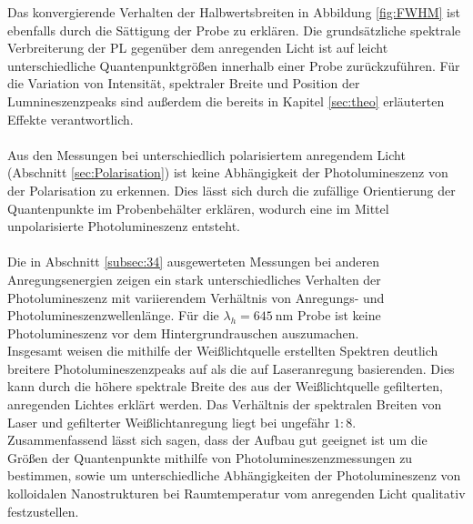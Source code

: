 Das konvergierende Verhalten der Halbwertsbreiten in Abbildung \ref{fig:FWHM} ist ebenfalls durch
die Sättigung der Probe zu erklären. Die grundsätzliche spektrale Verbreiterung der PL
gegenüber dem anregenden Licht ist auf leicht unterschiedliche Quantenpunktgrößen
innerhalb einer Probe zurückzuführen. Für die Variation von Intensität,
spektraler Breite und Position der Lumnineszenzpeaks sind außerdem die
bereits in Kapitel \ref{sec:theo} erläuterten Effekte verantwortlich. \\
\\
Aus den Messungen bei unterschiedlich polarisiertem anregendem Licht
(Abschnitt \ref{sec:Polarisation}) ist keine Abhängigkeit der Photolumineszenz
von der Polarisation zu erkennen. Dies lässt sich durch die zufällige Orientierung
der Quantenpunkte im Probenbehälter erklären, wodurch eine im Mittel unpolarisierte Photolumineszenz entsteht.\\
\\
Die in Abschnitt \ref{subsec:34} ausgewerteten Messungen bei anderen Anregungsenergien
zeigen ein stark unterschiedliches Verhalten der Photolumineszenz
mit variierendem Verhältnis von Anregungs- und Photolumineszenzwellenlänge.
Für die $\lambda_h = \SI{645}{\nano\meter}$ Probe ist keine Photolumineszenz
vor dem Hintergrundrauschen auszumachen. \\
Insgesamt weisen die mithilfe der Weißlichtquelle erstellten Spektren deutlich breitere
Photolumineszenzpeaks auf als die auf Laseranregung basierenden. Dies kann durch die
höhere spektrale Breite des aus der Weißlichtquelle gefilterten, anregenden Lichtes erklärt werden. Das Verhältnis der spektralen Breiten von Laser und gefilterter Weißlichtanregung liegt bei ungefähr $1:8$. \\

Zusammenfassend lässt sich sagen, dass der Aufbau gut geeignet ist um die Größen der
Quantenpunkte mithilfe von Photolumineszenzmessungen zu bestimmen, sowie um unterschiedliche
Abhängigkeiten der Photolumineszenz von kolloidalen Nanostrukturen bei Raumtemperatur vom anregenden Licht qualitativ festzustellen.
%
%
